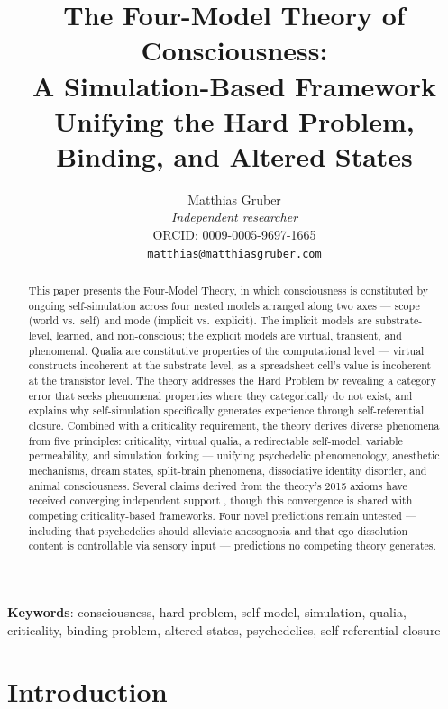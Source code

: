 \documentclass[12pt]{article}
\title{The Four-Model Theory of Consciousness:\\A Simulation-Based Framework Unifying the Hard Problem, Binding, and Altered States}
\author{Matthias Gruber\\
\textit{Independent researcher}\\
ORCID: \href{https://orcid.org/0009-0005-9697-1665}{0009-0005-9697-1665}\\
\texttt{matthias@matthiasgruber.com}}
\date{}
\newcommand{\rev}[1]{#1}
\begin{document}
\maketitle

\begin{abstract}\singlespacing
This paper presents the Four-Model Theory, in which consciousness is constituted by ongoing self-simulation across four nested models arranged along two axes --- scope (world vs.\ self) and mode (implicit vs.\ explicit). The implicit models are substrate-level, learned, and non-conscious; the explicit models are virtual, transient, and phenomenal. Qualia are constitutive properties of the computational level --- virtual constructs incoherent at the substrate level, as a spreadsheet cell's value is incoherent at the transistor level. The theory addresses the Hard Problem by revealing a category error that seeks phenomenal properties where they categorically do not exist, and explains why self-simulation specifically generates experience through self-referential closure. Combined with a criticality requirement, the theory derives diverse phenomena from five principles: criticality, virtual qualia, a redirectable self-model, variable permeability, and simulation forking --- unifying psychedelic phenomenology, anesthetic mechanisms, dream states, split-brain phenomena, dissociative identity disorder, and animal consciousness. Several claims derived from the theory's 2015 axioms have received converging independent support \citep{HengenShew2025,AlgomShriki2026,Bhatt2024}, though this convergence is shared with competing criticality-based frameworks. Four novel predictions remain untested --- including that psychedelics should alleviate anosognosia and that ego dissolution content is controllable via sensory input --- predictions no competing theory generates.
\end{abstract}

\noindent\textbf{Keywords}: consciousness, hard problem, self-model, simulation, qualia, criticality, binding problem, altered states, psychedelics, \rev{self-referential closure}




\section{Introduction}
\end{document}
